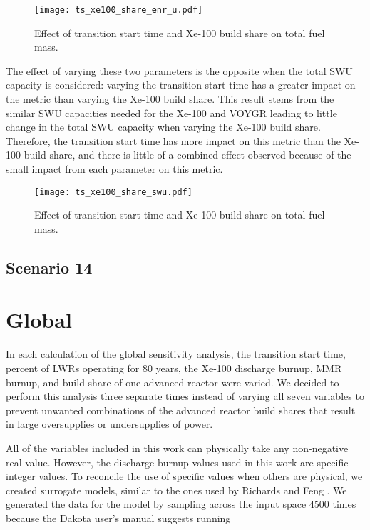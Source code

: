 \begin{figure}[h!]
    \centering
    \texttt{[image: ts\_xe100\_share\_enr\_u.pdf]}
    \caption{Effect of transition start time and Xe-100 build share 
    on total fuel mass.}
    \label{fig:ts_xe100_share_enr_u}
\end{figure}

The effect of varying these two parameters is the opposite when the total 
\gls{SWU} capacity is considered: varying the transition start time has 
a greater impact on the metric than varying the Xe-100 build share. This 
result stems from the similar \gls{SWU} capacities needed for the Xe-100 
and VOYGR leading to little change in the total \gls{SWU} capacity when 
varying the Xe-100 build share. Therefore, the transition start time has 
more impact on this metric than the Xe-100 build share, and there is little 
of a combined effect observed because of the small impact from each parameter 
on this metric. 

\begin{figure}[h!]
    \centering
    \texttt{[image: ts\_xe100\_share\_swu.pdf]}
    \caption{Effect of transition start time and Xe-100 build share 
    on total fuel mass.}
    \label{fig:ts_xe100_share_swu}
\end{figure}

\subsection{Scenario 14}

\section{Global}
In each calculation of the global sensitivity analysis, the transition start 
time, percent of \glspl{LWR} operating for 80 years, the Xe-100 discharge 
burnup, \gls{MMR} burnup, and build share of one advanced reactor were 
varied. We decided to perform this analysis three separate times instead of 
varying all seven variables to prevent unwanted combinations of the 
advanced reactor build shares that result in large oversupplies or 
undersupplies of power. 

All of the variables included in this work can physically take any non-negative 
real value. However, the discharge burnup values used in this work are specific 
integer values. To reconcile the use of specific values when others are physical, 
we created surrogate models, similar to the ones used by Richards and Feng 
\cite{richards_application_2021}. We generated the data for the model by sampling 
across the input space 4500 times because the Dakota user's manual 
\cite{adams_dakota_2019} suggests running 

